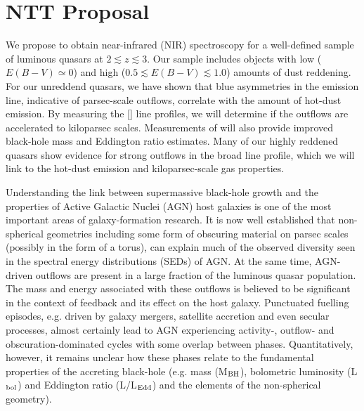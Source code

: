 \section{NTT Proposal}

We propose to obtain near-infrared (NIR) spectroscopy for a
well-defined sample of luminous quasars at $2 \lesssim z \lesssim
3$. Our sample includes objects with low ($E(B-V) \simeq 0$) and high
($0.5 \lesssim E(B-V) \lesssim 1.0$) amounts of dust reddening. For
our unreddend quasars, we have shown that blue asymmetries in the
 emission line, indicative of parsec-scale outflows,
correlate with the amount of hot-dust emission. By measuring the
[] line profiles, we will determine if the outflows are
accelerated to kiloparsec scales. Measurements of \hb will also
provide improved black-hole mass and Eddington ratio estimates. Many
of our highly reddened quasars show evidence for strong outflows in
the broad \ha line profile, which we will link to the
hot-dust emission and kiloparsec-scale gas properties.

Understanding the link between supermassive black-hole growth and the
properties of Active Galactic Nuclei (AGN) host galaxies is one of the
most important areas of galaxy-formation research. It is now well
established that non-spherical geometries including some form of
obscuring material on parsec scales (possibly in the form of a torus),
can explain much of the observed diversity seen in the spectral energy
distributions (SEDs) of AGN. At the same time, AGN-driven outflows are
present in a large fraction of the luminous quasar population. The
mass and energy associated with these outflows is believed to be
significant in the context of feedback and its effect on the host
galaxy. Punctuated fuelling episodes, e.g. driven by galaxy mergers,
satellite accretion and even secular processes, almost certainly lead
to AGN experiencing activity-, outflow- and obscuration-dominated
cycles with some overlap between phases. Quantitatively, however, it
remains unclear how these phases relate to the fundamental properties
of the accreting black-hole (e.g.  mass (M$_{\rm{BH}}$), bolometric
luminosity (L$_{\rm{bol}}$) and Eddington ratio (L/L$_{\rm{Edd}}$) and
the elements of the non-spherical geometry).

\vspace{1.5mm}

